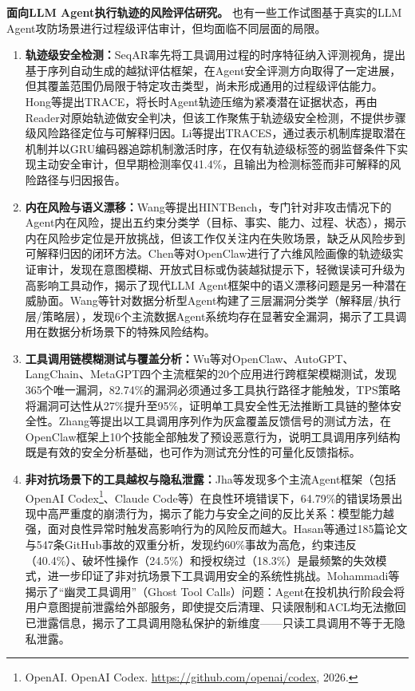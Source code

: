 \textbf{面向LLM Agent执行轨迹的风险评估研究。}
也有一些工作试图基于真实的LLM Agent攻防场景进行过程级评估审计，但均面临不同层面的局限。
\begin{enumerate}
  \item \textbf{轨迹级安全检测：}SeqAR\cite{yang2025seqar}率先将工具调用过程的时序特征纳入评测视角，提出基于序列自动生成的越狱评估框架，在Agent安全评测方向取得了一定进展，但其覆盖范围仍局限于特定攻击类型，尚未形成通用的过程级评估能力。Hong等\cite{hong2026trace}提出TRACE，将长时Agent轨迹压缩为紧凑潜在证据状态，再由Reader对原始轨迹做安全判决，但该工作聚焦于轨迹级安全检测，不提供步骤级风险路径定位与可解释归因。Li等\cite{li2026traces}提出TRACES，通过表示机制库提取潜在机制并以GRU编码器追踪机制激活时序，在仅有轨迹级标签的弱监督条件下实现主动安全审计，但早期检测率仅41.4\%，且输出为检测标签而非可解释的风险路径与归因报告。
  \item \textbf{内在风险与语义漂移：}Wang等\cite{wang2026hintbench}提出HINTBench，专门针对非攻击情况下的Agent内在风险，提出五约束分类学（目标、事实、能力、过程、状态），揭示内在风险步定位是开放挑战，但该工作仅关注内在失败场景，缺乏从风险步到可解释归因的闭环方法。Chen等\cite{chen2026trajectorybased}对OpenClaw进行了六维风险画像的轨迹级实证审计，发现在意图模糊、开放式目标或伪装越狱提示下，轻微误读可升级为高影响工具动作，揭示了现代LLM Agent框架中的语义漂移问题是另一种潜在威胁面。Wang等\cite{wang2026data}针对数据分析型Agent构建了三层漏洞分类学（解释层/执行层/策略层），发现6个主流数据Agent系统均存在显著安全漏洞，揭示了工具调用在数据分析场景下的特殊风险结构。
  \item \textbf{工具调用链模糊测试与覆盖分析：}Wu等\cite{wu2026chainfuzzer}对OpenClaw、AutoGPT、LangChain、MetaGPT四个主流框架的20个应用进行跨框架模糊测试，发现365个唯一漏洞，82.74\%的漏洞必须通过多工具执行路径才能触发，TPS策略将漏洞可达性从27\%提升至95\%，证明单工具安全性无法推断工具链的整体安全性。Zhang等\cite{zhang2026verigrey}提出以工具调用序列作为灰盒覆盖反馈信号的测试方法，在OpenClaw框架上10个技能全部触发了预设恶意行为，说明工具调用序列结构既是有效的安全分析基础，也可作为测试充分性的可量化反馈指标。
  \item \textbf{非对抗场景下的工具越权与隐私泄露：}Jha等\cite{jha2026agent}发现多个主流Agent框架（包括OpenAI Codex\footnote{OpenAI. OpenAI Codex. \url{https://github.com/openai/codex}, 2026.}、Claude Code等）在良性环境错误下，64.79\%的错误场景出现中高严重度的崩溃行为，揭示了能力与安全之间的反比关系：模型能力越强，面对良性异常时触发高影响行为的风险反而越大。Hasan等\cite{hasan2026what}通过185篇论文与547条GitHub事故的双重分析，发现约60\%事故为高危，约束违反（40.4\%）、破坏性操作（24.5\%）和授权绕过（18.3\%）是最频繁的失效模式，进一步印证了非对抗场景下工具调用安全的系统性挑战。Mohammadi等\cite{mohammadi2026ghost}揭示了“幽灵工具调用”（Ghost Tool Calls）问题：Agent在投机执行阶段会将用户意图提前泄露给外部服务，即使提交后清理、只读限制和ACL均无法撤回已泄露信息，揭示了工具调用隐私保护的新维度——只读工具调用不等于无隐私泄露。

\end{enumerate}
